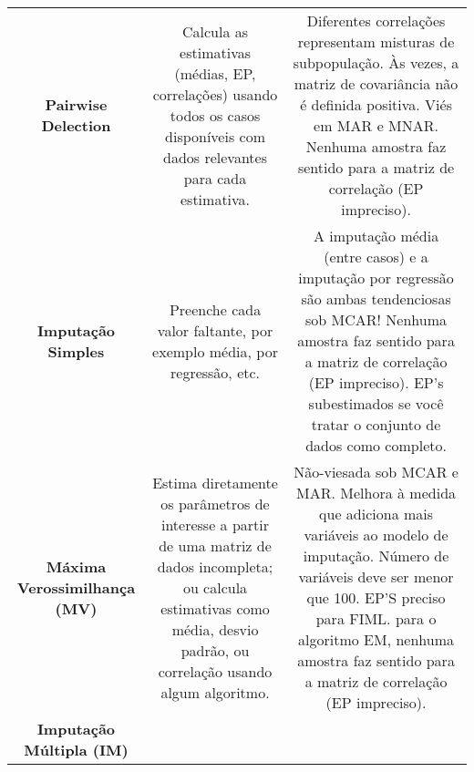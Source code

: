 \documentclass[
]{book}
\begin{document}
\begin{longtable}[]{@{}ccc@{}}
\begin{minipage}[t]{0.30\columnwidth}
\textbf{Pairwise Delection}\strut
\end{minipage} & \begin{minipage}[t]{0.30\columnwidth}\centering
Calcula as estimativas (médias, EP, correlações) usando todos os casos disponíveis com dados relevantes para cada estimativa.\strut
\end{minipage} & \begin{minipage}[t]{0.30\columnwidth}\centering
Diferentes correlações representam misturas de subpopulação. Às vezes, a matriz de covariância não é definida positiva. Viés em MAR e MNAR. Nenhuma amostra faz sentido para a matriz de correlação (EP impreciso).\strut
\end{minipage}\tabularnewline
\begin{minipage}[t]{0.30\columnwidth}\centering
\textbf{Imputação Simples}\strut
\end{minipage} & \begin{minipage}[t]{0.30\columnwidth}\centering
Preenche cada valor faltante, por exemplo média, por regressão, etc.\strut
\end{minipage} & \begin{minipage}[t]{0.30\columnwidth}\centering
A imputação média (entre casos) e a imputação por regressão são ambas tendenciosas sob MCAR! Nenhuma amostra faz sentido para a matriz de correlação (EP impreciso). EP's subestimados se você tratar o conjunto de dados como completo.\strut
\end{minipage}\tabularnewline
\begin{minipage}[t]{0.30\columnwidth}\centering
\textbf{Máxima Verossimilhança (MV)}\strut
\end{minipage} & \begin{minipage}[t]{0.30\columnwidth}\centering
Estima diretamente os parâmetros de interesse a partir de uma matriz de dados incompleta; ou calcula estimativas como média, desvio padrão, ou correlação usando algum algoritmo.\strut
\end{minipage} & \begin{minipage}[t]{0.30\columnwidth}\centering
Não-viesada sob MCAR e MAR. Melhora à medida que adiciona mais variáveis ao modelo de imputação. Número de variáveis deve ser menor que 100. EP'S preciso para FIML. para o algoritmo EM, nenhuma amostra faz sentido para a matriz de correlação (EP impreciso).\strut
\end{minipage}\tabularnewline
\begin{minipage}[t]{0.30\columnwidth}\centering
\textbf{Imputação Múltipla (IM)}\strut

\end{minipage}
\end{longtable}
\end{document}
